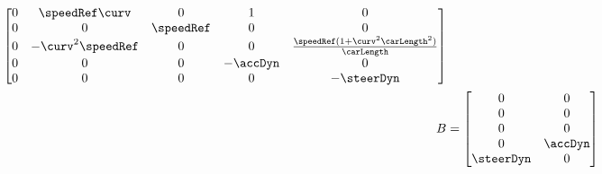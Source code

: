 {\begin{minipage}{\textwidth}
\begin{align}
\begin{bmatrix}
								0 & \speedRef\curv & 0 & 1 & 0 \\ 
								0 & 0 & \speedRef & 0 & 0 \\ 
								0 & -\curv^2\speedRef & 0 & 0 & \frac{\speedRef(1+\curv^2\carLength^2)}{\carLength} \\ 
								0 & 0 & 0 & -\accDyn & 0 \\ 
								0 & 0 & 0 & 0 & -\steerDyn
							\end{bmatrix}\\
							B & = \begin{bmatrix}
								0 & 0 \\
								0 & 0 \\
								0 & 0 \\
								0 & \accDyn \\
								\steerDyn & 0 
							\end{bmatrix}
						\end{align}
					\end{minipage}
				}
			\fi




